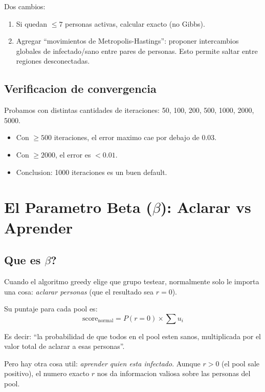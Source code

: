 \documentclass[11pt]{article}
\begin{document}
Dos cambios:
\begin{enumerate}
  \item Si quedan $\leq 7$ personas activas, calcular exacto (no Gibbs).
  \item Agregar ``movimientos de Metropolis-Hastings'': proponer intercambios
        globales de infectado/sano entre pares de personas.
        Esto permite saltar entre regiones desconectadas.
\end{enumerate}

\subsection{Verificacion de convergencia}

Probamos con distintas cantidades de iteraciones:
50, 100, 200, 500, 1000, 2000, 5000.

\begin{itemize}
  \item Con $\geq 500$ iteraciones, el error maximo cae por debajo de 0.03.
  \item Con $\geq 2000$, el error es $< 0.01$.
  \item Conclusion: 1000 iteraciones es un buen default.
\end{itemize}

\section{El Parametro Beta ($\beta$): Aclarar vs Aprender}

\subsection{Que es $\beta$?}

Cuando el algoritmo greedy elige que grupo testear, normalmente solo
le importa una cosa: \emph{aclarar personas} (que el resultado sea $r=0$).

Su puntaje para cada pool es:
$$\text{score}_{\text{normal}} = P(r=0) \times \sum u_i$$

Es decir: ``la probabilidad de que todos en el pool esten sanos, multiplicada
por el valor total de aclarar a esas personas''.

Pero hay otra cosa util: \emph{aprender quien esta infectado}.
Aunque $r > 0$ (el pool sale positivo), el numero exacto $r$ nos da
informacion valiosa sobre las personas del pool.
\end{document}
